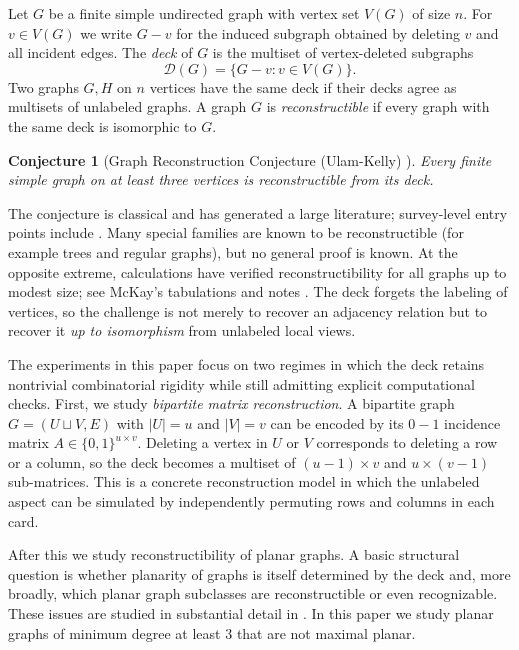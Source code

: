 \documentclass[11pt]{amsart}
\newtheorem{conjecture}{Conjecture}
\begin{document}
Let $G$ be a finite simple undirected graph with vertex set $V(G)$ of size $n$.
For $v\in V(G)$ we write $G-v$ for the induced subgraph obtained by deleting $v$ and all incident edges.
The \emph{deck} of $G$ is the multiset of vertex-deleted subgraphs
\[
\mathcal{D}(G) = \{ G-v : v\in V(G)\}.
\]
Two graphs $G,H$ on $n$ vertices have the same deck if their decks agree as multisets of unlabeled graphs.
A graph $G$ is \emph{reconstructible} if every graph with the same deck is isomorphic to $G$.

\begin{conjecture}[Graph Reconstruction Conjecture (Ulam-Kelly) \cite{Ulam1960,Kelly1957}]
Every finite simple graph on at least three vertices is reconstructible from its deck.
\end{conjecture}

The conjecture is classical and has generated a large literature; survey-level entry points include \cite{BondyHemminger1977}.
Many special families are known to be reconstructible (for example trees and regular graphs), but no general proof is known.
At the opposite extreme, calculations have verified reconstructibility for all graphs up to modest size; see McKay's tabulations and notes \cite{McKaySmallReconstruction2021}. The deck forgets the labeling of vertices, so the challenge is not merely to recover an adjacency relation but to recover it \emph{up to isomorphism} from unlabeled local views.

The experiments in this paper focus on two regimes in which the deck retains nontrivial combinatorial rigidity while still admitting explicit computational checks. First, we study \emph{bipartite matrix reconstruction}.
A bipartite graph $G=(U\sqcup V,E)$ with $|U|=u$ and $|V|=v$ can be encoded by its $0-1$ incidence matrix $A\in\{0,1\}^{u\times v}$.
Deleting a vertex in $U$ or $V$ corresponds to deleting a row or a column, so the deck becomes a multiset of $(u-1)\times v$ and $u\times (v-1)$ sub-matrices.
This is a concrete reconstruction model in which the unlabeled aspect can be simulated by independently permuting rows and columns in each card.

After this we study reconstructibility of planar graphs. A basic structural question is whether planarity of graphs is itself determined by the deck and, more broadly, which planar graph subclasses are reconstructible or even recognizable. These issues are studied in substantial detail in \cite{BilinskiKwonYu2007}.
In this paper we study planar graphs of minimum degree at least $3$ that are not maximal planar.
\end{document}
